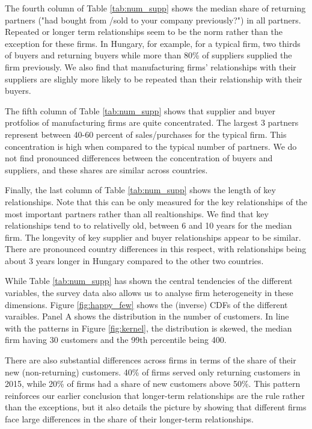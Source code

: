\documentclass[final, dvipsnames, authoryear,12pt]{elsarticle}
\begin{document}
The fourth column of Table \ref{tab:num_supp} shows the median share of returning partners ("had bought from /sold to your company previously?")  in all partners. Repeated or longer term relationships seem to be the norm rather than the exception for these firms. In Hungary, for example, for a typical firm, two thirds of buyers and returning buyers while more than 80\% of suppliers supplied the firm previously. We also find that manufacturing firms' relationships with their suppliers are slighly more likely to be repeated than their relationship with their buyers.


The fifth column of Table \ref{tab:num_supp} shows that supplier and buyer protfolios of manufacturing firms are quite concentrated. The largest 3 partners represent between 40-60 percent of sales/purchases for the typical firm. This concentration is high when compared to the typical number of partners. We do not find pronounced differences between the concentration of buyers and suppliers, and these shares are similar across countries.

Finally, the last column of Table \ref{tab:num_supp} shows the length of key relationships. Note that this can be only measured for the key relationships of the most important partners rather than all realtionships. We find that key relationships tend to to relativelly old, between 6 and 10 years for the median firm. The longevity of key supplier and buyer relationships appear to be similar. There are pronounced country differences in this respect, with relationships being about 3 years longer in Hungary compared to the other two countries. 

While Table \ref{tab:num_supp} has shown the central tendencies of the different variables, the survey data also allows us to analyse firm heterogeneity in these dimensions. Figure \ref{fig:happy_few} shows the (inverse) CDFs of the different varaibles. Panel A shows the distribution in the number of customers. In line with the patterns in Figure \ref{fig:kernel}, the distribution is skewed, the median firm having 30 customers and the 99th percentile being 400.

There are also substantial differences across firms in terms of the share of their new (non-returning) customers. 40\% of firms served only returning customers in 2015, while 20\% of firms had a share of new customers above 50\%. This pattern reinforces our earlier conclusion that longer-term relationships are the rule rather than the exceptions, but it also details the picture by showing that different firms face large differences in the share of their longer-term relationships.
\end{document}
